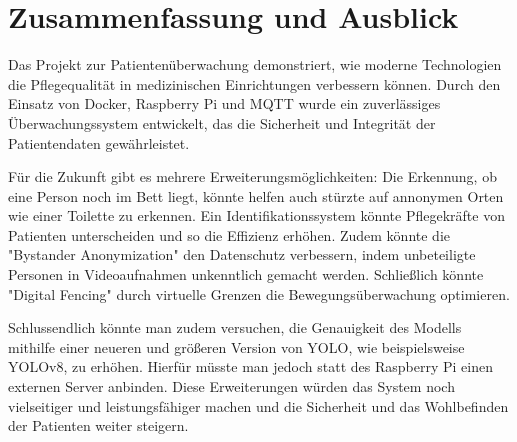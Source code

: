\section{Zusammenfassung und Ausblick}
Das Projekt zur Patientenüberwachung demonstriert, wie moderne Technologien die Pflegequalität in medizinischen Einrichtungen verbessern können. Durch den Einsatz von Docker, Raspberry Pi und MQTT wurde ein zuverlässiges Überwachungssystem entwickelt, das die Sicherheit und Integrität der Patientendaten gewährleistet.

Für die Zukunft gibt es mehrere Erweiterungsmöglichkeiten: Die Erkennung, ob eine Person noch im Bett liegt, könnte helfen auch stürzte auf annonymen Orten wie einer Toilette zu erkennen. Ein Identifikationssystem könnte Pflegekräfte von Patienten unterscheiden und so die Effizienz erhöhen. Zudem könnte die "Bystander Anonymization" den Datenschutz verbessern, indem unbeteiligte Personen in Videoaufnahmen unkenntlich gemacht werden. Schließlich könnte "Digital Fencing" durch virtuelle Grenzen die Bewegungsüberwachung optimieren.

Schlussendlich könnte man zudem versuchen, die Genauigkeit des Modells mithilfe einer neueren und größeren Version von YOLO, wie beispielsweise YOLOv8, zu erhöhen. Hierfür müsste man jedoch statt des Raspberry Pi einen externen Server anbinden. Diese Erweiterungen würden das System noch vielseitiger und leistungsfähiger machen und die Sicherheit und das Wohlbefinden der Patienten weiter steigern.
